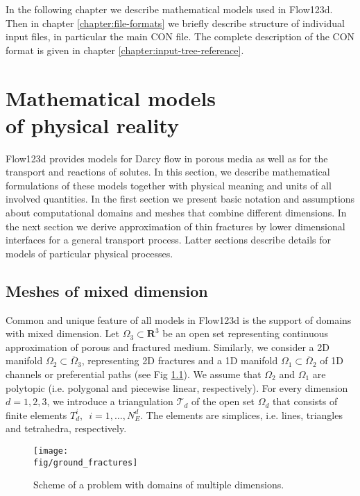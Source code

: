 \documentclass[12pt,a4paper]{report}
\def\Real{{\mathbf R}}
\def\fig{figures}
\begin{document}

In the following chapter we describe mathematical models used in Flow123d.
Then in chapter \ref{chapter:file-formats} we briefly describe structure of individual input files, in particular the main CON file.
The complete description of the CON format is given in chapter \ref{chapter:input-tree-reference}.


\chapter{Mathematical models \\of physical reality}
\label{PhysicalModels}

Flow123d provides models for Darcy flow in porous media as well as for the transport and reactions of solutes. In this section, we describe 
mathematical formulations of these models together with physical meaning and units of all involved quantities. In the first section we present 
basic notation and assumptions about computational domains and meshes that combine different dimensions. In the next section we
derive approximation of thin fractures by lower dimensional interfaces for a general transport process. Latter sections describe details for models of particular
physical processes.

\section{Meshes of mixed dimension}
Common and unique feature of all models in Flow123d is the support of
domains with mixed dimension. 
Let $\Omega_{3} \subset \Real^3$ be an open set representing continuous approximation of porous and fractured medium.
Similarly, we consider a 2D manifold $\Omega_2\subset\overline\Omega_3$, representing 2D fractures and a 1D manifold $\Omega_1\subset \overline\Omega_2$ of 1D channels or preferential paths (see Fig \ref{fig:multi-dim}).
We assume that $\Omega_2$ and $\Omega_1$ are polytopic (i.e. polygonal and piecewise linear, respectively).
For every dimension $d=1,2,3$, we introduce a triangulation $\mathcal{T}_{d}$ of the open set $\Omega_d$
that consists of finite elements $T_{d}^{i},$\ $i = 1,\dots,N_{E}^{d}$.
The elements are simplices, i.e. lines, triangles and tetrahedra, respectively.

\begin{figure}[h]
\centering
\texttt{[image: \\fig/ground\_fractures]}
\caption{
    \label{fig:multi-dim}
    Scheme of a problem with domains of multiple dimensions.
}
\end{figure}
\end{document}

